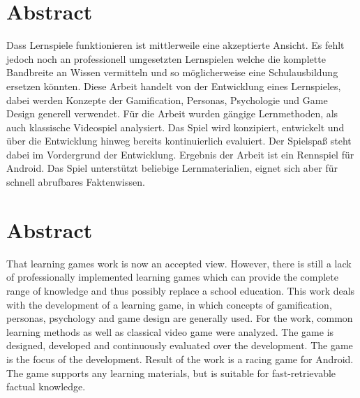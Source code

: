 \section*{Abstract}
Dass Lernspiele funktionieren ist mittlerweile eine akzeptierte Ansicht. Es fehlt jedoch noch an professionell umgesetzten Lernspielen welche die komplette Bandbreite an Wissen vermitteln und so möglicherweise eine Schulausbildung ersetzen könnten.
Diese Arbeit handelt von der Entwicklung eines Lernspieles, dabei werden Konzepte der Gamification, Personas, Psychologie und Game Design generell verwendet. Für die Arbeit wurden gängige Lernmethoden, als auch klassische Videospiel analysiert. Das Spiel wird konzipiert, entwickelt und über die Entwicklung hinweg bereits kontinuierlich evaluiert. Der Spielspaß steht dabei im Vordergrund der Entwicklung.
Ergebnis der Arbeit ist ein Rennspiel für Android. Das Spiel unterstützt beliebige Lernmaterialien, eignet sich aber für schnell abrufbares Faktenwissen.

\vfill

\section*{Abstract}
That learning games work is now an accepted view. However, there is still a lack of professionally implemented learning games which can provide the complete range of knowledge and thus possibly replace a school education.
This work deals with the development of a learning game, in which concepts of gamification, personas, psychology and game design are generally used. For the work, common learning methods as well as classical video game were analyzed. The game is designed, developed and continuously evaluated over the development. The game is the focus of the development.
Result of the work is a racing game for Android. The game supports any learning materials, but is suitable for fast-retrievable factual knowledge.

\vfill\newpage
